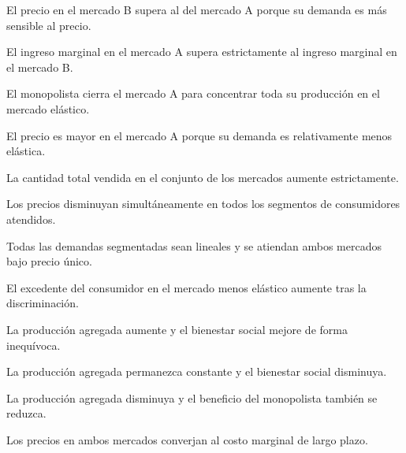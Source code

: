 \begin{opts}
    \item El precio en el mercado B supera al del mercado A porque su demanda es más sensible al precio.
    \item El ingreso marginal en el mercado A supera estrictamente al ingreso marginal en el mercado B.
    \item El monopolista cierra el mercado A para concentrar toda su producción en el mercado elástico.
    \item El precio es mayor en el mercado A porque su demanda es relativamente menos elástica.
\end{opts}

\begin{opts}
    \item La cantidad total vendida en el conjunto de los mercados aumente estrictamente.
    \item Los precios disminuyan simultáneamente en todos los segmentos de consumidores atendidos.
    \item Todas las demandas segmentadas sean lineales y se atiendan ambos mercados bajo precio único.
    \item El excedente del consumidor en el mercado menos elástico aumente tras la discriminación.
\end{opts}

\begin{opts}
    \item La producción agregada aumente y el bienestar social mejore de forma inequívoca.
    \item La producción agregada permanezca constante y el bienestar social disminuya.
    \item La producción agregada disminuya y el beneficio del monopolista también se reduzca.
    \item Los precios en ambos mercados converjan al costo marginal de largo plazo.
\end{opts}

